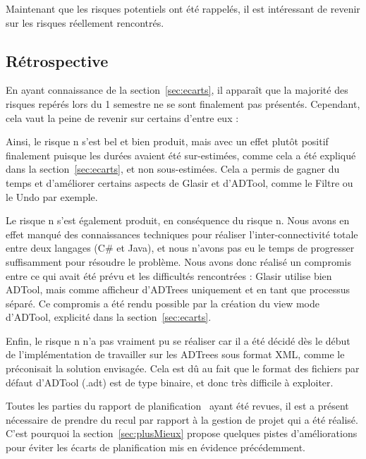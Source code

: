 Maintenant que les risques potentiels ont été rappelés, il est intéressant de revenir sur les risques réellement rencontrés.

\subsection{Rétrospective}
\label{ssec:risquesRetro}

En ayant connaissance de la {\sc section}~\ref{sec:ecarts}, il apparaît que la majorité des risques repérés lors du 1\ier{} semestre ne se sont finalement pas présentés. Cependant, cela vaut la peine de revenir sur certains d'entre eux :

Ainsi, le risque n s'est bel et bien produit, mais avec un effet plutôt positif finalement puisque les durées avaient été sur-estimées, comme cela a été expliqué dans la {\sc section}~\ref{sec:ecarts}, et non sous-estimées. Cela a permis de gagner du temps et d'améliorer certains aspects de Glasir et d'ADTool, comme le Filtre ou le Undo par exemple.

Le risque n s'est également produit, en conséquence du risque n. Nous avons en effet manqué des connaissances techniques pour réaliser l'inter-connectivité totale entre deux langages (C\# et Java), et nous n'avons pas eu le temps de progresser suffisamment pour résoudre le problème. Nous avons donc réalisé un compromis entre ce qui avait été prévu et les difficultés rencontrées : Glasir utilise bien ADTool, mais comme afficheur d'ADTrees uniquement et en tant que processus séparé. Ce compromis a été rendu possible par la création du \og view mode \fg{} d'ADTool, explicité dans la {\sc section}~\ref{sec:ecarts}.

Enfin, le risque n n'a pas vraiment pu se réaliser car il a été décidé dès le début de l'implémentation de travailler sur les ADTrees sous format XML, comme le préconisait la solution envisagée. Cela est dû au fait que le format des fichiers par défaut d'ADTool (.adt) est de type binaire, et donc très difficile à exploiter.

Toutes les parties du rapport de planification~\cite{planif} ayant été revues, il est a présent nécessaire de prendre du recul par rapport à la gestion de projet qui a été réalisé. C'est pourquoi la {\sc section}~\ref{sec:plusMieux} propose quelques pistes d'améliorations pour éviter les écarts de planification mis en évidence précédemment.